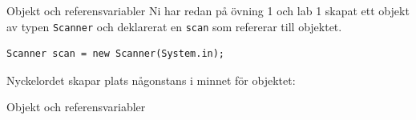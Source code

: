 \documentclass{lecturenotes}
\begin{document}
\begin{Slide}{Objekt och referensvariabler}
Ni har redan på övning 1 och lab 1 skapat ett objekt av typen \texttt{Scanner} och deklarerat en  \texttt{scan} som refererar till objektet.
\begin{lstlisting}
Scanner scan = new Scanner(System.in);
\end{lstlisting}
 Nyckelordet  skapar plats någonstans i minnet för objektet:\\
 \vspace{1em}
\end{Slide}

\begin{Slide}{Objekt och referensvariabler}

\end{Slide}
\end{document}
